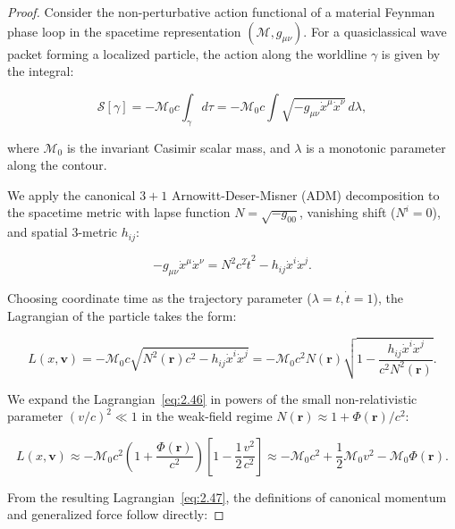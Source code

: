 \documentclass[11pt,a4paper]{article}
\theoremstyle{definition}
\begin{document}
\begin{proof}
Consider the non-perturbative action functional of a material Feynman phase loop in the spacetime representation $(\mathcal{M}, g_{\mu\nu})$. For a quasiclassical wave packet forming a localized particle, the action along the worldline $\gamma$ is given by the integral:

\begin{equation}\label{eq:2.44}\tag{2.44}
\mathcal{S}[\gamma] = -\mathcal{M}_0 c \int_{\gamma} d\tau = -\mathcal{M}_0 c \int \sqrt{-g_{\mu\nu} \dot{x}^\mu \dot{x}^\nu} \, d\lambda,
\end{equation}

where $\mathcal{M}_0$ is the invariant Casimir scalar mass, and $\lambda$ is a monotonic parameter along the contour.

We apply the canonical $3+1$ Arnowitt-Deser-Misner (ADM) decomposition to the spacetime metric with lapse function $N = \sqrt{-g_{00}}$, vanishing shift ($N^i = 0$), and spatial 3-metric $h_{ij}$:

\begin{equation}\label{eq:2.45}\tag{2.45}
-g_{\mu\nu}\dot{x}^\mu \dot{x}^\nu = N^2 c^2 \dot{t}^2 - h_{ij}\dot{x}^i \dot{x}^j.
\end{equation}

Choosing coordinate time as the trajectory parameter ($\lambda = t, \dot{t} = 1$), the Lagrangian of the particle takes the form:

\begin{equation}\label{eq:2.46}\tag{2.46}
L(x, \mathbf{v}) = -\mathcal{M}_0 c \sqrt{N^2(\mathbf{r}) c^2 - h_{ij}\dot{x}^i \dot{x}^j} = -\mathcal{M}_0 c^2 N(\mathbf{r}) \sqrt{1 - \frac{h_{ij}\dot{x}^i \dot{x}^j}{c^2 N^2(\mathbf{r})}}.
\end{equation}

We expand the Lagrangian~\eqref{eq:2.46} in powers of the small non-relativistic parameter $(v/c)^2 \ll 1$ in the weak-field regime $N(\mathbf{r}) \approx 1 + \Phi(\mathbf{r})/c^2$:

\begin{equation}\label{eq:2.47}\tag{2.47}
L(x, \mathbf{v}) \approx -\mathcal{M}_0 c^2 \left( 1 + \frac{\Phi(\mathbf{r})}{c^2} \right) \left[ 1 - \frac{1}{2}\frac{v^2}{c^2} \right] \approx -\mathcal{M}_0 c^2 + \frac{1}{2}\mathcal{M}_0 v^2 - \mathcal{M}_0 \Phi(\mathbf{r}).
\end{equation}

From the resulting Lagrangian~\eqref{eq:2.47}, the definitions of canonical momentum and generalized force follow directly:


\end{proof}
\end{document}
